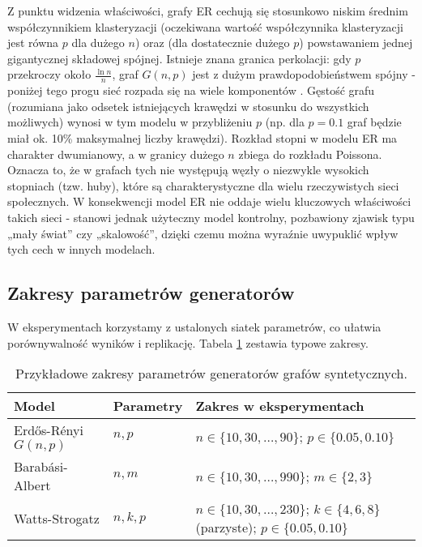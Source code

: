 Z punktu widzenia właściwości, grafy ER cechują się stosunkowo niskim średnim współczynnikiem klasteryzacji (oczekiwana wartość współczynnika klasteryzacji jest równa $p$ dla dużego $n$) oraz (dla dostatecznie dużego $p$) powstawaniem jednej gigantycznej składowej spójnej. Istnieje znana granica perkolacji: gdy $p$ przekroczy około $\frac{\ln n}{n}$, graf $G(n, p)$ jest z dużym prawdopodobieństwem spójny - poniżej tego progu sieć rozpada się na wiele komponentów \cite{ErdosRenyi1960}. Gęstość grafu (rozumiana jako odsetek istniejących krawędzi w stosunku do wszystkich możliwych) wynosi w tym modelu w przybliżeniu $p$ (np. dla $p=0.1$ graf będzie miał ok. 10\% maksymalnej liczby krawędzi). Rozkład stopni w modelu ER ma charakter dwumianowy, a w granicy dużego $n$ zbiega do rozkładu Poissona. Oznacza to, że w grafach tych nie występują węzły o niezwykle wysokich stopniach (tzw. huby), które są charakterystyczne dla wielu rzeczywistych sieci społecznych. W konsekwencji model ER nie oddaje wielu kluczowych właściwości takich sieci - stanowi jednak użyteczny model kontrolny, pozbawiony zjawisk typu „mały świat” czy „skalowość”, dzięki czemu można wyraźnie uwypuklić wpływ tych cech w innych modelach.


\subsection{Zakresy parametrów generatorów}
\label{sec:gen-ranges}
W eksperymentach korzystamy z ustalonych siatek parametrów, co ułatwia porównywalność wyników i replikację. Tabela \ref{tab:gen-ranges} zestawia typowe zakresy.

\begin{table}[h]
\centering
\begin{tabular}{@{}lll@{}}
\toprule
Model & Parametry & Zakres w eksperymentach \\
\midrule
Erdős-Rényi $G(n,p)$ & $n, p$ & $n\in\{10,30,\dots,90\}$; $p\in\{0.05,0.10\}$ \\
Barabási-Albert & $n, m$ & $n\in\{10,30,\dots,990\}$; $m\in\{2,3\}$ \\
Watts-Strogatz & $n, k, p$ & $n\in\{10,30,\dots,230\}$; $k\in\{4,6,8\}$ (parzyste); $p\in\{0.05,0.10\}$ \\
\bottomrule
\end{tabular}
\caption{Przykładowe zakresy parametrów generatorów grafów syntetycznych.}
\label{tab:gen-ranges}
\end{table}

